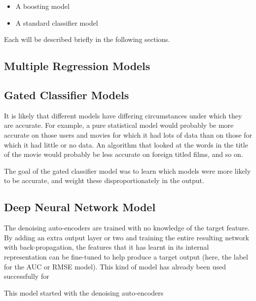 \documentclass{article}
\begin{document}
\begin{itemize}
\item A boosting model
\item A standard classifier model
\end{itemize}

Each will be described briefly in the following sections.

\subsection{Multiple Regression Models}

\subsection{Gated Classifier Models}

It is likely that different models have differing circumstances under which they are accurate.  For example, a pure statistical model would probably be more accurate on those users and movies for which it had lots of data than on those for which it had little or no data.  An algorithm that looked at the words in the title of the movie would probably be less accurate on foreign titled films, and so on.

The goal of the gated classifier model was to learn which models were more likely to be accurate, and weight these disproportionately in the output.


\subsection{Deep Neural Network Model}

The denoising auto-encoders are trained with no knowledge of the target feature.  By adding an extra output layer or two and training the entire resulting network with back-propagation, the features that it has learnt in its internal representation can be fine-tuned to help produce a target output (here, the label for the AUC or RMSE model).  This kind of model has already been used successfully for 

This model started with the denoising auto-encoders
\end{document}
